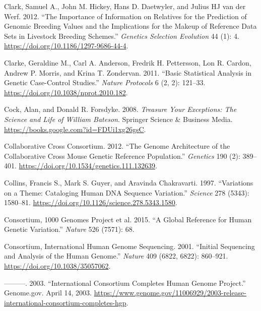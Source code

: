 \documentclass[
]{book}
\newlength{\cslhangindent}
\newlength{\cslentryspacingunit} %
\newenvironment{CSLReferences}[2] %
 {%
  \setlength{\parindent}{0pt}
  \ifodd #1
  \let\oldpar\par
  \def\par{\hangindent=\cslhangindent\oldpar}
  \fi
  \setlength{\parskip}{#2\cslentryspacingunit}
 }%
 {}
\begin{document}
\begin{CSLReferences}{1}{0}
\leavevmode{}%
Clark, Samuel A., John M. Hickey, Hans D. Daetwyler, and Julius HJ van der Werf. 2012. {``The Importance of Information on Relatives for the Prediction of Genomic Breeding Values and the Implications for the Makeup of Reference Data Sets in Livestock Breeding Schemes.''} \emph{Genetics Selection Evolution} 44 (1): 4. \url{https://doi.org/10.1186/1297-9686-44-4}.

\leavevmode{}%
Clarke, Geraldine M., Carl A. Anderson, Fredrik H. Pettersson, Lon R. Cardon, Andrew P. Morris, and Krina T. Zondervan. 2011. {``Basic Statistical Analysis in Genetic Case-Control Studies.''} \emph{Nature Protocols} 6 (2, 2): 121--33. \url{https://doi.org/10.1038/nprot.2010.182}.

\leavevmode{}%
Cock, Alan, and Donald R. Forsdyke. 2008. \emph{Treasure {Your Exceptions}: {The Science} and {Life} of {William Bateson}}. {Springer Science \& Business Media}. \url{https://books.google.com?id=FDUi1xg26gsC}.

\leavevmode{}%
Collaborative Cross Consortium. 2012. {``The {Genome Architecture} of the {Collaborative Cross Mouse Genetic Reference Population}.''} \emph{Genetics} 190 (2): 389--401. \url{https://doi.org/10.1534/genetics.111.132639}.

\leavevmode{}%
Collins, Francis S., Mark S. Guyer, and Aravinda Chakravarti. 1997. {``Variations on a {Theme}: {Cataloging Human DNA Sequence Variation}.''} \emph{Science} 278 (5343): 1580--81. \url{https://doi.org/10.1126/science.278.5343.1580}.

\leavevmode{}%
Consortium, 1000 Genomes Project et al. 2015. {``A Global Reference for Human Genetic Variation.''} \emph{Nature} 526 (7571): 68.

\leavevmode{}%
Consortium, International Human Genome Sequencing. 2001. {``Initial Sequencing and Analysis of the Human Genome.''} \emph{Nature} 409 (6822, 6822): 860--921. \url{https://doi.org/10.1038/35057062}.

\leavevmode{}%
---------. 2003. {``International {Consortium Completes Human Genome Project}.''} {Genome.gov}. April 14, 2003. \url{https://www.genome.gov/11006929/2003-release-international-consortium-completes-hgp}.


\end{CSLReferences}
\end{document}

